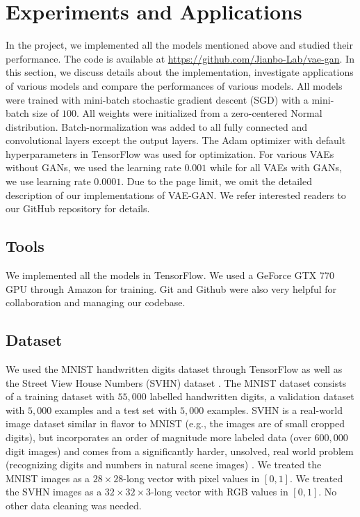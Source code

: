 \documentclass[10pt]{article}
\begin{document}
\section{Experiments and Applications}
In the project, we implemented all the models mentioned above and studied their performance. The code is available at \href{url}{https://github.com/Jianbo-Lab/vae-gan}. In this section, we discuss details about the implementation, investigate applications of various models and compare the performances of various models. 
All models were trained with mini-batch stochastic gradient descent (SGD) with a mini-batch size of $100$. All weights were initialized from a zero-centered Normal distribution. Batch-normalization \cite{sergey2015batchnorm} was added to all fully connected and convolutional layers except the output layers. The Adam \cite{kingma2014adam} optimizer with default hyperparameters in TensorFlow was used for optimization. For various VAEs without GANs, we used the learning rate $0.001$ while for all VAEs with GANs, we use learning rate $0.0001$. 
Due to the page limit, we omit the detailed description of our implementations of VAE-GAN. We refer interested readers to our GitHub repository for details. 
\subsection{Tools}
We implemented all the models in TensorFlow. We used a GeForce GTX 770 GPU through Amazon for training. Git and Github were also very helpful for collaboration and managing our codebase. 
\subsection{Dataset}
We used the MNIST handwritten digits dataset \cite{lecun1998gradient} through TensorFlow as well as the Street View House Numbers (SVHN) dataset \cite{netzer2011reading}. The MNIST dataset consists of a training dataset with $55,000$ labelled handwritten digits, a validation dataset with $5,000$ examples and a test set with $5,000$ examples. SVHN is a real-world image dataset similar in flavor to MNIST (e.g., the images are of small cropped digits), but incorporates an order of magnitude more labeled data (over $600,000$ digit images) and comes from a significantly harder, unsolved, real world problem (recognizing digits and numbers in natural scene images) \cite{netzer2011reading}.
We treated the MNIST images as a $28\times 28$-long vector with pixel values in $[0,1]$. We treated the SVHN images as a $32 \times 32 \times 3$-long vector with RGB values in $[0,1]$. No other data cleaning was needed.
\end{document}
